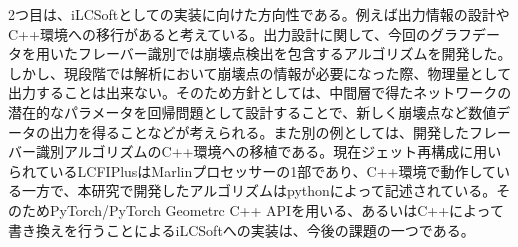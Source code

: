 2つ目は、iLCSoftとしての実装に向けた方向性である。例えば出力情報の設計やC++環境への移行があると考えている。出力設計に関して、今回のグラフデータを用いたフレーバー識別では崩壊点検出を包含するアルゴリズムを開発した。しかし、現段階では解析において崩壊点の情報が必要になった際、物理量として出力することは出来ない。そのため方針としては、中間層で得たネットワークの潜在的なパラメータを回帰問題として設計することで、新しく崩壊点など数値データの出力を得ることなどが考えられる。また別の例としては、開発したフレーバー識別アルゴリズムのC++環境への移植である。現在ジェット再構成に用いられているLCFIPlusはMarlinプロセッサーの1部であり、C++環境で動作している一方で、本研究で開発したアルゴリズムはpythonによって記述されている。そのためPyTorch/PyTorch Geometrc C++ APIを用いる、あるいはC++によって書き換えを行うことによるiLCSoftへの実装は、今後の課題の一つである。